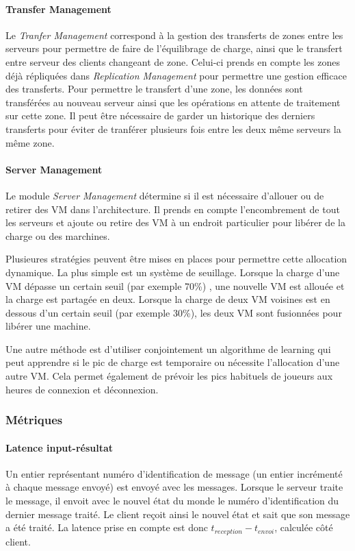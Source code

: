 \paragraph{Transfer Management\\}
Le \textit{Tranfer Management} correspond à la gestion des transferts de zones entre les serveurs pour permettre de faire de l'équilibrage de charge, ainsi que le transfert entre serveur des clients changeant de zone.
Celui-ci prends en compte les zones déjà répliquées dans \textit{Replication Management} pour permettre une gestion efficace des transferts.
Pour permettre le transfert d'une zone, les données sont transférées au nouveau serveur ainsi que les opérations en attente de traitement sur cette zone.
Il peut être nécessaire de garder un historique des derniers transferts pour éviter de tranférer plusieurs fois entre les deux même serveurs la même zone.

\paragraph{Server Management\\}
Le module \textit{Server Management} détermine si il est nécessaire d'allouer ou de retirer des VM dans l'architecture.
Il prends en compte l'encombrement de tout les serveurs et ajoute ou retire des VM à un endroit particulier pour libérer de la charge ou des marchines.

Plusieures stratégies peuvent être mises en places pour permettre cette allocation dynamique.
La plus simple est un système de seuillage.
Lorsque la charge d'une VM dépasse un certain seuil (par exemple 70\%) , une nouvelle VM est allouée et la charge est partagée en deux.
Lorsque la charge de deux VM voisines est en dessous d'un certain seuil (par exemple 30\%), les deux VM sont fusionnées pour libérer une machine.

Une autre méthode est d'utiliser conjointement un algorithme de learning qui peut apprendre si le pic de charge est temporaire ou nécessite l'allocation d'une autre VM.
Cela permet également de prévoir les pics habituels de joueurs aux heures de connexion et déconnexion.

\subsubsection{Métriques}

\paragraph{Latence input-résultat\\}
Un entier représentant numéro d'identification de message (un entier incrémenté à chaque message envoyé) est envoyé avec les messages.
Lorsque le serveur traite le message, il envoit avec le nouvel état du monde le numéro d'identification du dernier message traité.
Le client reçoit ainsi le nouvel état et sait que son message a été traité.
La latence prise en compte est donc $t_{reception} - t_{envoi}$, calculée côté client.

